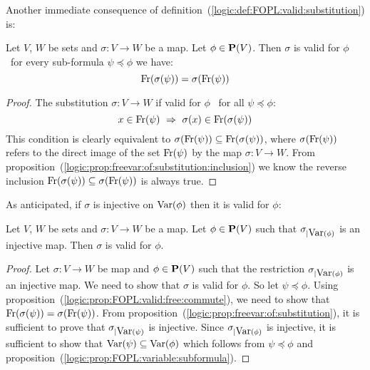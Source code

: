 Another immediate consequence of
definition~(\ref{logic:def:FOPL:valid:substitution}) is:
\begin{prop}\label{logic:prop:FOPL:valid:free:commute}
    Let $V$, $W$ be sets and $\sigma:V\to W$ be a map. Let $\phi\in\mbox{${\bf P}(V)$}$. 
    Then $\sigma$ is valid for $\phi$ \ifand\ for every sub-formula 
    $\psi\preceq\phi$ we have:
    \[
        \mbox{\rm Fr}(\sigma(\psi)) =\sigma(\mbox{\rm Fr}(\psi))
    \]
\end{prop}
\begin{proof}
The substitution $\sigma:V\to W$ if valid for $\phi$ \ifand\ for all
$\psi\preceq\phi$:
    \[
    x\in\free(\psi)\ \Rightarrow\ \sigma(x)\in\free(\sigma(\psi))
    \]
This condition is clearly equivalent to
$\sigma(\mbox{\rm Fr}(\psi))\subseteq\mbox{\rm Fr}(\sigma(\psi))$, where
$\sigma(\mbox{\rm Fr}(\psi))$ refers to the direct image of the set
$\mbox{\rm Fr}(\psi)$ by the map $\sigma:V\to W$. From
proposition~(\ref{logic:prop:freevar:of:substitution:inclusion}) we
know the reverse inclusion
$\mbox{\rm Fr}(\sigma(\psi))\subseteq\sigma(\mbox{\rm Fr}(\psi))$ is always true.
\end{proof}

As anticipated, if $\sigma$ is injective on $\mbox{\rm Var}(\phi)$ then it is
valid for $\phi$:

\begin{prop}\label{logic:prop:FOPL:valid:injective}
    Let $V$, $W$ be sets and $\sigma:V\to W$ be a map. Let $\phi\in\mbox{${\bf P}(V)$}$ 
    such that $\sigma_{|\mbox{\rm Var}(\phi)}$ is an injective map. Then $\sigma$ 
    is valid for $\phi$.
\end{prop}
\begin{proof}
Let $\sigma:V\to W$ be map and $\phi\in\mbox{${\bf P}(V)$}$ such that the
restriction $\sigma_{|\mbox{\rm Var}(\phi)}$ is an injective map. We need to
show that $\sigma$ is valid for $\phi$. So let $\psi\preceq\phi$.
Using proposition~(\ref{logic:prop:FOPL:valid:free:commute}), we
need to show that $\mbox{\rm Fr}(\sigma(\psi)) =\sigma(\mbox{\rm Fr}(\psi))$. From
proposition~(\ref{logic:prop:freevar:of:substitution}), it is
sufficient to prove that $\sigma_{|\mbox{\rm Var}(\psi)}$ is injective. Since
$\sigma_{|\mbox{\rm Var}(\phi)}$ is injective, it is sufficient to show that
$\mbox{\rm Var}(\psi)\subseteq\mbox{\rm Var}(\phi)$ which follows from $\psi\preceq\phi$
and proposition~(\ref{logic:prop:FOPL:variable:subformula}).
\end{proof}

